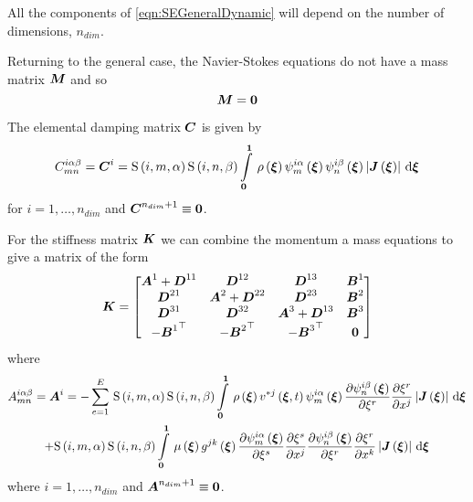 All the components of \ref{eqn:SEGeneralDynamic} will depend on the number of dimensions, $n_{dim}$.

Returning to the general case, the Navier-Stokes equations do not have a mass
matrix $\matr{M}$ and so 
\begin{equation}
  \matr{M}=\matr{0}
\end{equation}

The elemental damping matrix $\matr{C}$ is given by
\begin{equation}
  C^{i\alpha\beta}_{mn}=\matr{C}^{i}=\idxgsf{i}{m}{\alpha}\idxgsf{i}{n}{\beta}
  \gint{\vectr{0}}{\vectr{1}}{\fnof{\rho}{\vectr{\xi}}
    \idxgbfn{i}{m}{\alpha}{\vectr{\xi}}\idxgbfn{i}{n}{\beta}{\vectr{\xi}}
    \abs{\fnof{\matr{J}}{\vectr{\xi}}}}{\vectr{\xi}}
\end{equation}
for $i=1,\ldots,n_{dim}$ and $\matr{C}^{n_{dim}+1}\equiv\matr{0}$.

For the stiffness matrix $\matr{K}$ we can combine the momentum a mass equations to give a matrix of the form
\begin{equation}
  \matr{K}=
   \begin{bmatrix}
     \matr{A}^{1}+\matr{D}^{11} & \matr{D}^{12} & \matr{D}^{13} & \matr{B}^{1}\\
     \matr{D}^{21} & \matr{A}^{2}+\matr{D}^{22} & \matr{D}^{23} & \matr{B}^{2}\\
     \matr{D}^{31} & \matr{D}^{32} & \matr{A}^{3}+\matr{D}^{13} & \matr{B}^{3}\\
     -\transpose{\matr{B}^{1}} & -\transpose{\matr{B}^{2}} & -\transpose{\matr{B}^{3}} & \matr{0}
   \end{bmatrix}
\end{equation}
where
\begin{multline}
  A^{i\alpha\beta}_{mn}=\matr{A}^{i}= 
  -\gsum{e=1}{E}{\idxgsf{i}{m}{\alpha}\idxgsf{i}{n}{\beta}
    \gint{\vectr{0}}{\vectr{1}}{\fnof{\rho}{\vectr{\xi}}\fnof{v^{*j}}{\vectr{\xi},t}
      \idxgbfn{i}{m}{\alpha}{\vectr{\xi}}\delby{\idxgbfn{i}{n}{\beta}{\vectr{\xi}}}{\xi^{r}}
      \delby{\xi^{r}}{x^{j}}\abs{\fnof{\matr{J}}{\vectr{\xi}}}}{\vectr{\xi}}} \\
  +\idxgsf{i}{m}{\alpha}\idxgsf{i}{n}{\beta}\gint{\vectr{0}}{\vectr{1}}{
      \fnof{\mu}{\vectr{\xi}}\fnof{g^{jk}}{\vectr{\xi}}\delby{\idxgbfn{i}{m}{\alpha}{\vectr{\xi}}}{\xi^{s}}
      \delby{\xi^{s}}{x^{j}}\delby{\idxgbfn{i}{n}{\beta}{\vectr{\xi}}}{\xi^{r}}\delby{\xi^{r}}{x^{k}}
      \abs{\fnof{\matr{J}}{\vectr{\xi}}}}{\vectr{\xi}}\\
\end{multline}
where $i=1,\dots,n_{dim}$ and $\matr{A}^{n_{dim}+1}\equiv\matr{0}$.

